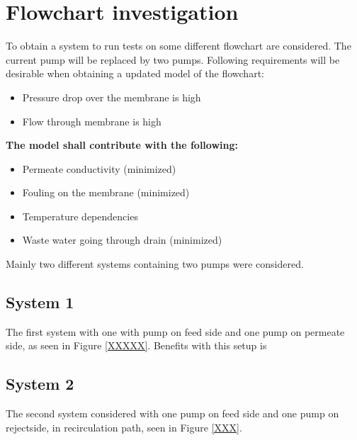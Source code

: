 
\section{Flowchart investigation}
To obtain a system to run tests on some different flowchart are considered. The current pump will be replaced by two pumps. Following requirements will be desirable when obtaining a updated model of the flowchart:
\begin{itemize}
\renewcommand\labelitemi{ }
\item Pressure drop over the membrane is high
\item Flow through membrane is high
\end{itemize}
\textbf{The model shall contribute with the following:}
\begin{itemize}
\renewcommand\labelitemi{ }
\item Permeate conductivity (minimized)
\item Fouling on the membrane (minimized)
\item Temperature dependencies 
\item Waste water going through drain (minimized)
\end{itemize}

Mainly two different systems containing two pumps were considered. 

\subsection{System 1}
The first system with one with pump on feed side and one pump on permeate side, as seen in Figure \ref{XXXXX}. Benefits with this setup is 

\subsection{System 2}
The second system considered with one pump on feed side and one pump on rejectside, in recirculation path, seen in Figure \ref{XXX}.

